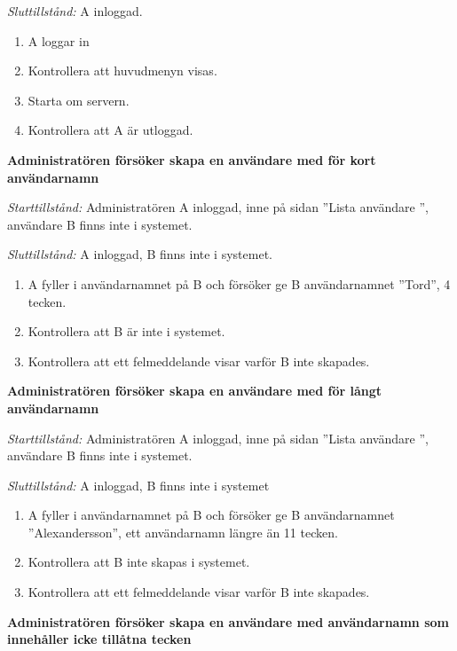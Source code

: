 \documentclass[a4paper]{article}
\begin{document}
\begin{FT}
\emph{Sluttillstånd:} A inloggad.

\begin{enumerate}
\item A loggar in
\item Kontrollera att huvudmenyn visas.
\item Starta om servern.
\item Kontrollera att A är utloggad.
\end{enumerate}



\item
\textbf{Administratören försöker skapa en användare med för kort användarnamn}

\emph{Starttillstånd:} Administratören A inloggad, inne på sidan ''Lista användare '', användare B finns inte i systemet.

\emph{Sluttillstånd:} A inloggad, B finns inte i systemet.

\begin{enumerate}
\item A fyller i användarnamnet på B och försöker ge B användarnamnet ''Tord'', 4 tecken.
\item Kontrollera att B är inte i systemet.
\item Kontrollera att ett felmeddelande visar varför B inte skapades.
\end{enumerate}

\item
\textbf{Administratören försöker skapa en användare med för långt användarnamn}

\emph{Starttillstånd:} Administratören A inloggad, inne på sidan ''Lista användare '', användare B finns inte i systemet.

\emph{Sluttillstånd:} A inloggad, B finns inte i systemet

\begin{enumerate}
\item A fyller i användarnamnet på B och försöker ge B användarnamnet ''Alexandersson'', ett användarnamn längre än 11 tecken.
\item Kontrollera att B inte skapas i systemet.
\item Kontrollera att ett felmeddelande visar varför B inte skapades.
\end{enumerate}

\item
\textbf{Administratören försöker skapa en användare med användarnamn som innehåller icke tillåtna tecken}


\end{FT}
\end{document}
